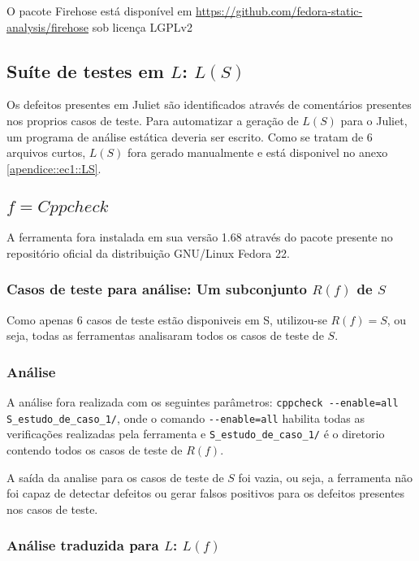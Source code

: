 O pacote Firehose está disponível em \url{https://github.com/fedora-static-analysis/firehose} sob licença LGPLv2

\subsection{Suíte de testes em $L$: $L(S)$}

Os defeitos presentes em Juliet são identificados através de comentários presentes nos proprios casos de teste. Para automatizar a geração de $L(S)$ para o Juliet, um programa de análise estática deveria ser escrito. Como se tratam de 6 arquivos curtos, $L(S)$ fora gerado manualmente e está disponivel no anexo \ref{apendice::ec1::LS}.

\subsection{$f = Cppcheck$}

A ferramenta fora instalada em sua versão 1.68 através do pacote presente no repositório oficial da distribuição GNU/Linux Fedora 22.

\subsubsection{Casos de teste para análise: Um subconjunto $R(f)$ de $S$}

Como apenas 6 casos de teste estão disponiveis em S, utilizou-se $R(f) = S$, ou seja, todas as ferramentas analisaram todos os casos de teste de $S$.

\subsubsection{Análise}

A análise fora realizada com os seguintes parâmetros:
\lstinline{cppcheck --enable=all S_estudo_de_caso_1/},
onde o comando \lstinline{--enable=all} habilita todas as verificações realizadas pela ferramenta e \lstinline{S_estudo_de_caso_1/} é o diretorio contendo todos os casos de teste de $R(f)$.

A saída da analise para os casos de teste de $S$ foi vazia, ou seja, a ferramenta não foi capaz de detectar defeitos ou gerar falsos positivos para os defeitos presentes nos casos de teste.

\subsubsection{Análise traduzida para $L$: $L(f)$}

